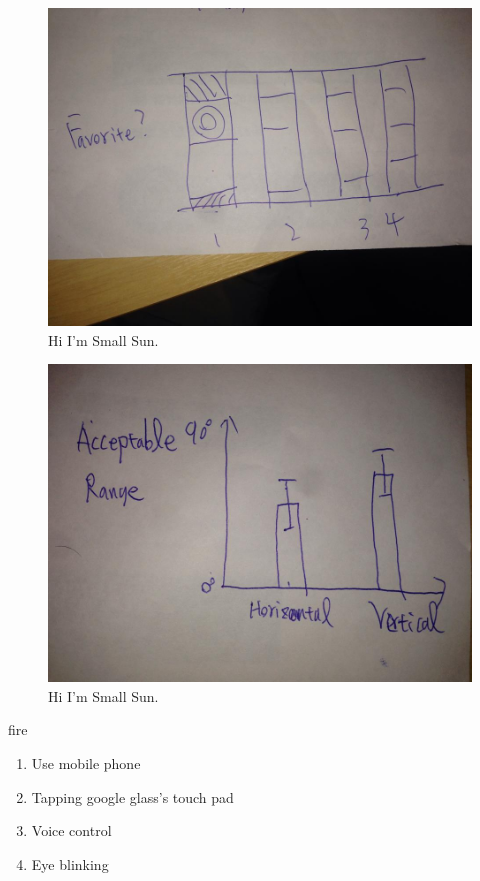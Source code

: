\begin{figure}[!t]
\centering
\includegraphics[width=0.9\columnwidth]{Figures/US2_favoriteFire.jpg}
\caption{Hi I'm Small Sun.}
\label{fig:PS_Frus}
\end{figure}

\begin{figure}[!t]
\centering
\includegraphics[width=0.9\columnwidth]{Figures/US2_acceptableRange.jpg}
\caption{Hi I'm Small Sun.}
\label{fig:PS_Frus}
\end{figure}

fire
\begin{enumerate}
\item Use mobile phone
\item Tapping google glass's touch pad
\item Voice control
\item Eye blinking
\end{enumerate}

